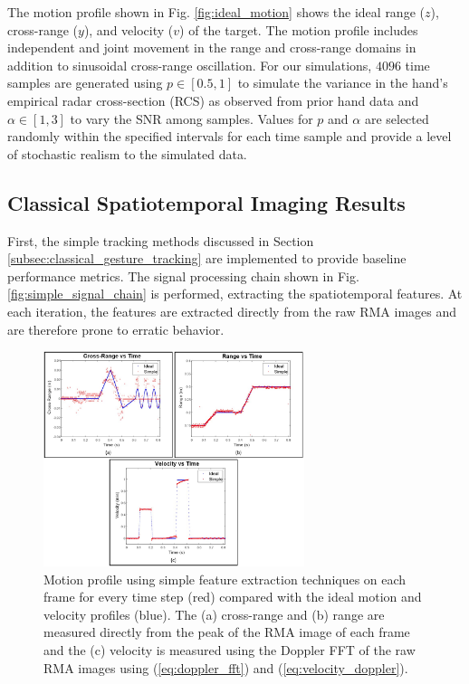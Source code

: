 \documentclass[10pt,journal,final]{IEEEtran}
\begin{document}
The motion profile shown in Fig. \ref{fig:ideal_motion} shows the ideal range ($z$), cross-range ($y$), and velocity ($v$) of the target. 
The motion profile includes independent and joint movement in the range and cross-range domains in addition to sinusoidal cross-range oscillation.
For our simulations, $4096$ time samples are generated using $p \in [0.5,1]$ to simulate the variance in the hand's empirical radar cross-section (RCS) as observed from prior hand data and $\alpha \in [1,3]$ to vary the SNR among samples. 
Values for $p$ and $\alpha$ are selected randomly within the specified intervals for each time sample and provide a level of stochastic realism to the simulated data.

\subsection{Classical Spatiotemporal Imaging Results}
\label{subsec:simple_gesture_tracking_results}
First, the simple tracking methods discussed in Section \ref{subsec:classical_gesture_tracking} are implemented to provide baseline performance metrics.
The signal processing chain shown in Fig. \ref{fig:simple_signal_chain} is performed, extracting the spatiotemporal features. 
At each iteration, the features are extracted directly from the raw RMA images and are therefore prone to erratic behavior. 

\begin{figure}[h]
	\centering
	\includegraphics[width=3in]{smith9.jpg}
	\caption{Motion profile using simple feature extraction techniques on each frame for every time step (red) compared with the ideal motion and velocity profiles (blue). The (a) cross-range and (b) range are measured directly from the peak of the RMA image of each frame and the (c) velocity is measured using the Doppler FFT of the raw RMA images using (\ref{eq:doppler_fft}) and (\ref{eq:velocity_doppler}).}
	\label{fig:simple_motion}
\end{figure}
\end{document}
